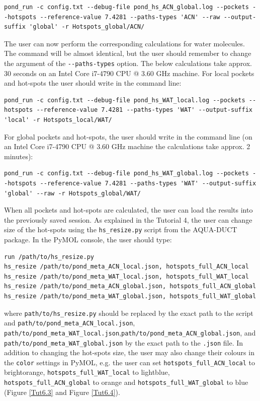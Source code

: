 \documentclass[9pt,tutorial]{livecoms}
\begin{document}
\begin{lstlisting}
pond_run -c config.txt --debug-file pond_hs_ACN_global.log --pockets --hotspots --reference-value 7.4281 --paths-types 'ACN' --raw --output-suffix 'global' -r Hotspots_global/ACN/ 
\end{lstlisting}
The user can now perform the corresponding calculations for water molecules. The command will be almost identical, but the user should remember to change the argument of the \texttt{-{}-paths-types} option. The below calculations take approx. 30 seconds on an Intel Core i7-4790 CPU @ 3.60 GHz machine. For local pockets and hot-spots the user should write in the command line:
\begin{lstlisting}
pond_run -c config.txt --debug-file pond_hs_WAT_local.log --pockets --hotspots --reference-value 7.4281 --paths-types 'WAT' --output-suffix 'local' -r Hotspots_local/WAT/ 
\end{lstlisting}
For global pockets and hot-spots, the user should write in the command line (on an Intel Core i7-4790 CPU @ 3.60 GHz machine the calculations take approx. 2 minutes):
\begin{lstlisting}
pond_run -c config.txt --debug-file pond_hs_WAT_global.log --pockets --hotspots --reference-value 7.4281 --paths-types 'WAT' --output-suffix 'global' --raw -r Hotspots_global/WAT/ 
\end{lstlisting}
When all pockets and hot-spots are calculated, the user can load the results into the previously saved session. As explained in the Tutorial 4, the user can change size of the hot-spots using the \texttt{hs\_resize.py} script from the AQUA-DUCT package. In the PyMOL console, the user should type:
\begin{lstlisting}[columns=fullflexible]
run /path/to/hs_resize.py
hs_resize /path/to/pond_meta_ACN_local.json, hotspots_full_ACN_local
hs_resize /path/to/pond_meta_WAT_local.json, hotspots_full_WAT_local
hs_resize /path/to/pond_meta_ACN_global.json, hotspots_full_ACN_global
hs_resize /path/to/pond_meta_WAT_global.json, hotspots_full_WAT_global
\end{lstlisting}
where \texttt{path/to/hs\_resize.py} should be replaced by the exact path to the script and \texttt{path/to/pond\_meta\_ACN\_local.json}, \texttt{path/to/pond\_meta\_WAT\_local.json},\newline \texttt{path/to/pond\_meta\_ACN\_global.json}, and \newline \texttt{path/to/pond\_meta\_WAT\_global.json} by the exact path to the \texttt{.json} file.
In addition to changing the hot-spots size, the user may also change their colours in the \texttt{color} settings in PyMOL, e.g. the user can set \texttt{hotspots\_full\_ACN\_local} to brightorange, \texttt{hotspots\_full\_WAT\_local} to lightblue, \texttt{hotspots\_full\_ACN\_global} \hfill to \hfill orange \hfill and \newline \texttt{hotspots\_full\_WAT\_global} to blue (Figure \ref{Tut6.3} and Figure \ref{Tut6.4}).
\end{document}

